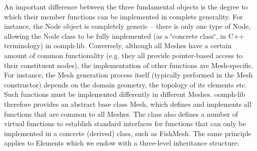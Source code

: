 An important difference between the three fundamental objects is the degree to which their member functions can be implemented in complete generality. For instance, the Node object is completely generic -- there is only one type of Node, allowing the Node class to be fully implemented (as a \char`\"{}concrete class\char`\"{}, in C++ terminology) in {\ttfamily oomph-\/lib}. Conversely, although all Meshes have a certain amount of common functionality (e.\+g. they all provide pointer-\/based access to their constituent nodes), the implementation of other functions are Mesh-\/specific. For instance, the Mesh generation process itself (typically performed in the Mesh constructor) depends on the domain geometry, the topology of its elements etc. Such functions must be implemented differently in different Meshes. {\ttfamily oomph-\/lib} therefore provides an abstract base class {\ttfamily Mesh}, which defines and implements all functions that are common to all Meshes. The class also defines a number of virtual functions to establish standard interfaces for functions that can only be implemented in a concrete (derived) class, such as {\ttfamily Fish\+Mesh}. The same principle applies to Elements which we endow with a three-\/level inheritance structure\+:
